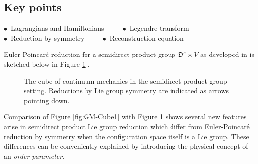 \documentclass[11pt, oneside]{article}   	%
\numberwithin{equation}{section}
\theoremstyle{plain}
\theoremstyle{definition}
\theoremstyle{remark}
\newcommand{\<}{\langle}
\renewcommand{\>}{\rangle}
\begin{document}
\subsection*{Key points}
\begin{center}
    $\bullet\,$ Lagrangians and Hamiltonians $\qquad$  
    $\bullet\,$ Legendre transform $\qquad$ \\  
    $\bullet\,$ Reduction by symmetry $\qquad$ 
    $\bullet\,$ Reconstruction equation  
\end{center}

Euler-Poincar\'e reduction for a semidirect product group $\mathfrak{D}^s\times V$ as developed in \cite{holm1998euler} is sketched below in Figure \ref{fig:cubesdp} \cite{holm2019stochastic}. 
%
\begin{figure}[h] 
\small
\centering
{}
\caption{The cube of continuum mechanics in the semidirect product group setting. Reductions by Lie group symmetry are indicated as arrows pointing down.}
\label{fig:cubesdp}
\end{figure}
%
 Comparison of Figure \ref{fig:GM-Cube1}  with Figure \ref{fig:cubesdp} shows several new features arise in semidirect product Lie group reduction which differ from Euler-Poincar\'e reduction by symmetry when the configuration space itself is a Lie group. These differences can be conveniently explained by introducing the physical concept of an \emph{order parameter}. 
 
\end{document}
